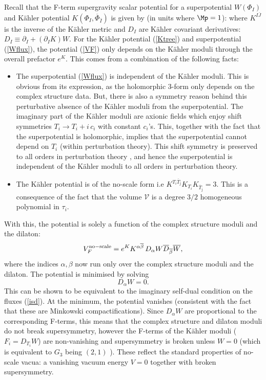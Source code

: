Recall that the F-term supergravity scalar potential for a  superpotential $W(\Phi_I)$ and K\"ahler potential $K(\Phi_I, \overline{\Phi}_{\bar{I}})$ is  given by (in units where $\Mp = 1$):
\be
\setlength\fboxsep{0.25cm}
\setlength\fboxrule{0.4pt}
\ee
where $K^{I \overline{J}}$ is the inverse of the K\"ahler metric and $D_{I}$ are  K\"ahler covariant derivatives:
 $D_{I} \equiv  \partial_{I} + (\partial_{I} K) W$. For the K\"ahler potential (\ref{Ktree}) and superpotential (\ref{Wflux}), the 
 potential (\ref{VF}) only depends on the K\"ahler moduli through the overall prefactor $e^K$. This comes from a combination of the following facts:

\begin{itemize}

\item The superpotential (\ref{Wflux}) is independent of the K\"ahler moduli. This is obvious from its expression, as the holomorphic 3-form only depends on the complex structure data. But, there is also a symmetry reason behind this perturbative absence of the K\"ahler moduli from the superpotential. The imaginary part of the 
K\"ahler moduli are axionic fields which enjoy shift symmetries $T_i\rightarrow T_i + i\, c_i$ with constant $c_i$'s. This, together 
with the fact that the superpotential is holomorphic, implies that the superpotential cannot depend on $T_{i}$ (within perturbation theory). This shift symmetry is preserved to all orders in perturbation theory \cite{Burgess:2005jx, Witten:1985bz, Burgess:1985zz, Dine:1986vd}, and hence the superpotential is independent of the K\"ahler moduli to all orders in perturbation theory.

\item The K\"ahler potential is of the no-scale form \cite{Cremmer:1983bf, Ellis:1983sf} i.e $K^{T_i\overline{T}_{\bar{\jmath}}} K_{T_i} K_{\overline{T}_{\bar{\jmath}}}=3$. This is a consequence of the fact that the volume $\mathcal{V}$ is a degree $3/2$ homogeneous polynomial in $\tau_i$.

\end{itemize}
With this, the potential is solely a function of the complex structure moduli and the dilaton:
$$
  V^{\rm no-scale}_{F}  = e^K K^{\alpha\overline{\beta}}\, D_{\alpha} W \overline{D}_{\overline{\beta}} \overline{W},
$$
where the indices $\alpha, \beta$ now run only over the complex structure moduli and the dilaton. The potential is minimised
by solving 
$$D_{\alpha} W = 0.$$
This can be shown to be equivalent to the imaginary self-dual condition on the fluxes (\ref{isd}).
At the minimum, the potential vanishes (consistent with the fact that these are Minkowski compactifications). Since $D_{\alpha} W$ are proportional to the corresponding F-terms, this means that the complex structure and dilaton moduli do not break supersymmetry, however the F-terms
of the K\"ahler moduli ($F_i = D_{T_{i}}W$) are non-vanishing and supersymmetry is broken unless $W=0$ (which is equivalent to $G_{3}$ being $(2,1)$ ).
These reflect the standard properties of no-scale vacua: a vanishing vacuum energy $V=0$ together with broken supersymmetry.

